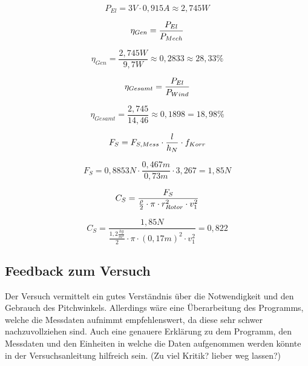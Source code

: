 $$P_{El} = 3V \cdot 0,915A \approx 2,745W$$



\begin{equation}
    \centering
    \eta_{Gen} = \frac{P_{El}}{P_{Mech}}
    \label{eq:230615_Generatorwirkungsgrad}
\end{equation}

$$\eta_{Gen} = \frac{2,745W}{9,7W} \approx 0,2833 \approx 28,33\% $$

\begin{equation}
    \centering
    \eta_{Gesamt} = \frac{P_{El}}{P_{Wind}}
    \label{eq:230615_Gesamtwirkungsgrad}
\end{equation}

$$\eta_{Gesamt} = \frac{2,745}{14,46}\approx 0,1898 = 18,98\%$$

\begin{equation}
    \centering
    F_S = F_{S,Mess} \cdot \frac{l}{h_N} \cdot f_{Korr}
    \label{eq:230615_Schubkraft}
\end{equation}

$$F_S = 0,8853N \cdot \frac{0,467m}{0,73m} \cdot 3,267 = 1,85N$$

\begin{equation}
    \centering
    C_S = \frac{F_S}{\frac{\rho}{2} \cdot \pi \cdot r_{Rotor}^2 \cdot v_1^2}
    \label{eq:230615_Schubbeiwert}
\end{equation}

$$C_S = \frac{1,85N}{\frac{1,2 \frac{kg}{m^3}}{2} \cdot \pi \cdot (0,17 m)^2 \cdot v_1^2} = 0,822$$


\subsection{Feedback zum Versuch}

Der Versuch vermittelt ein gutes Verständnis über die Notwendigkeit und den Gebrauch des Pitchwinkels. Allerdings wäre eine Überarbeitung des Programms, welche die Messdaten aufnimmt 
empfehlenswert, da diese sehr schwer nachzuvollziehen sind. Auch eine genauere Erklärung zu dem Programm, den Messdaten und den Einheiten in welche die Daten aufgenommen werden könnte in der Versuchsanleitung hilfreich sein.
(Zu viel Kritik? lieber weg lassen?)